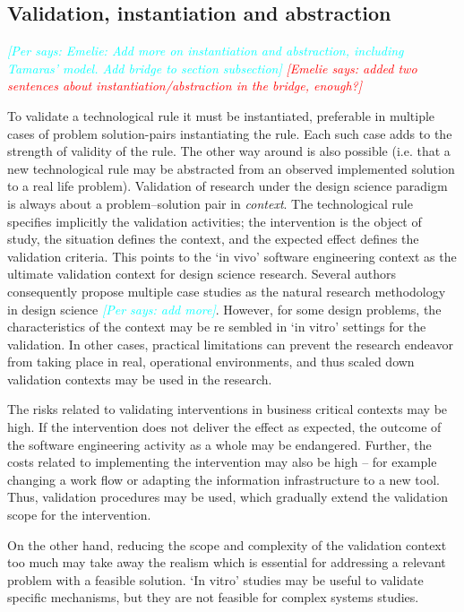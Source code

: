 \documentclass[graybox]{svmult}
\newcommand{\emelie}[1]{\textcolor{red}{{\it [Emelie says: #1]}}}
\newcommand{\per}[1]{\textcolor{cyan}{{\it [Per says: #1]}}}
\newcommand{\emelie}[1]{}
\newcommand{\per}[1]{}
\begin{document}
\subsection{Validation, instantiation and abstraction}
\per{Emelie: Add more on instantiation and abstraction, including Tamaras' model. Add bridge to section subsection} \emelie{added two sentences about instantiation/abstraction in the bridge, enough?}

To validate a technological rule it must be instantiated, preferable in multiple cases of problem solution-pairs instantiating the rule. Each such case adds to the strength of validity of the rule. The other way around is also possible (i.e. that a new technological rule may be abstracted from an observed implemented solution to a real life problem).
Validation of research under the design science paradigm is always about a problem--solution pair in \emph{context}. The technological rule specifies implicitly the validation activities; the intervention is the object of study, the situation defines the context, and the expected effect defines the validation criteria. This points to the `in vivo' software engineering context as the ultimate validation context for design science research. Several authors consequently propose multiple case studies as the natural research methodology in design science \cite{van_aken_management_2004}\per{add more}. However, for some design problems, the characteristics of the context may be re	sembled in `in vitro' settings for the validation. In other cases, practical limitations can prevent the research endeavor from taking place in real, operational environments, and thus scaled down validation contexts may be used in the research. 

The risks related to validating interventions in business critical contexts may be high. If the intervention does not deliver the effect as expected, the outcome of the software engineering activity as a whole may be endangered. Further, the costs related to implementing the intervention may also be high -- for example changing a work flow or adapting the information infrastructure to a new tool. Thus, validation procedures may be used, which gradually extend the validation scope for the intervention.

On the other hand, reducing the scope and complexity of the validation context too much may take away the realism which is essential for addressing a relevant problem with a feasible solution. `In vitro' studies may be useful to validate specific mechanisms, but they are not feasible for complex systems studies.  
\end{document}
